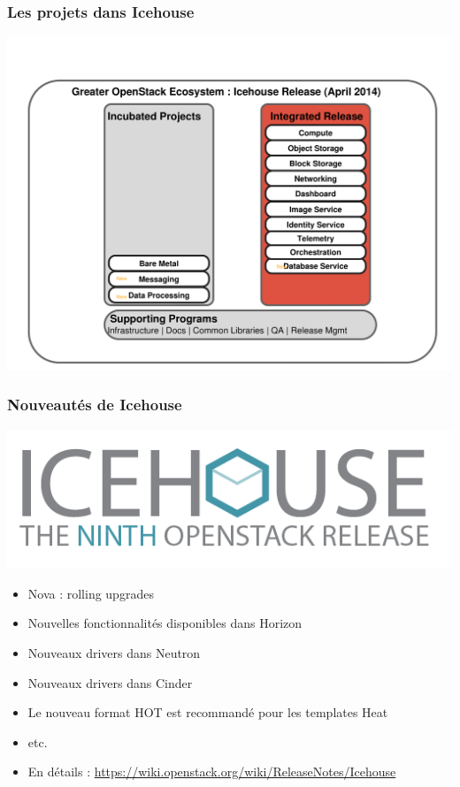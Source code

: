   \begin{frame}
    \frametitle{Les projets dans Icehouse}
    \includegraphics[width=\textwidth]{images/innovation2.pdf}
  \end{frame}

  \begin{frame}
    \frametitle{Nouveautés de Icehouse}
    \begin{center}
      \includegraphics{images/icehouse.png}
    \end{center}
    \begin{itemize}
      \item Nova : rolling upgrades
      \item Nouvelles fonctionnalités disponibles dans Horizon
      \item Nouveaux drivers dans Neutron
      \item Nouveaux drivers dans Cinder
      \item Le nouveau format HOT est recommandé pour les templates Heat
      \item etc.
      \item En détails : \url{https://wiki.openstack.org/wiki/ReleaseNotes/Icehouse}
    \end{itemize}
  \end{frame}

